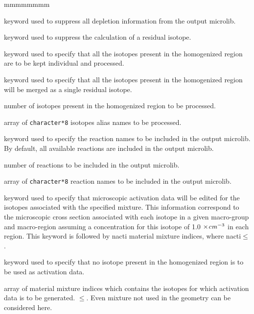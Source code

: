 \begin{ListeDeDescription}{mmmmmmmm}
\item[\moc{NODEPL}] keyword used to suppress all depletion information from the output microlib.

\item[\moc{NOMACR}] keyword used to suppress the calculation of a residual isotope.

\item[\moc{ALL}] keyword used to specify that all the isotopes present in the
homogenized region are to be kept individual and processed.

\item[\moc{RES}] keyword used to specify that all the isotopes present in the
homogenized region will be merged as a single residual isotope.

\item[\dusa{nis}] number of isotopes present in the homogenized
region to be processed.

\item[\dusa{HISO}] array of {\tt character*8} isotopes alias names to be processed.

\item[\moc{REAC}] keyword used to specify the reaction names to be included in the output microlib. By default, all available reactions
are included in the output microlib.

\item[\dusa{nreac}] number of reactions to be included in the output microlib.

\item[\dusa{HREAC}] array of {\tt character*8} reaction names to be included in the output microlib.

\item[\moc{ACTI}] keyword used to specify that microscopic activation
data will be edited for the isotopes associated with the specified mixture. This
information correspond to the microscopic cross section associated with each
isotope in a given macro-group and macro-region assuming a concentration
for this isotope of 1.0 $\times{\it cm}^{-3}$ in each region. This keyword is
followed by nacti material mixture indices, where
nacti$\le$.

\item[\moc{NONE}] keyword used to specify that no isotope present in the
homogenized region is to be used as activation data.

\item[\dusa{imixa}] array of material mixture indices which contains the
isotopes for which activation data is to be generated.
$\le$. Even mixture not used in the geometry 
can be considered here.


\end{ListeDeDescription}
